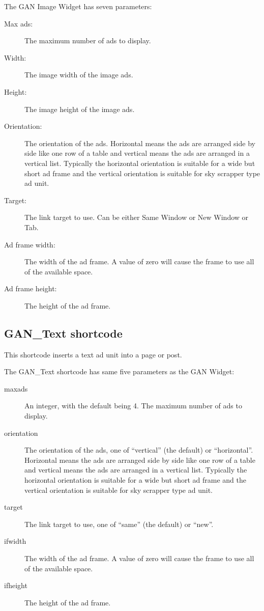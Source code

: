 \documentclass[letterpaper]{article}
\begin{document}
The GAN Image Widget has seven parameters:
\begin{description}
  \item[Max ads:] The maximum number of ads to display.
  \item[Width:] The image width of the image ads.
  \item[Height:] The image height of the image ads.
  \item[Orientation:] The orientation of the ads. Horizontal
means the ads are arranged side by side like one row of a table and
vertical means the ads are arranged in a vertical list. Typically the
horizontal orientation is suitable for a wide but short ad frame and the
vertical orientation is suitable for sky scrapper type ad unit.
  \item[Target:] The link target to use. Can be either Same 
Window or New Window or Tab.
  \item[Ad frame width:] The width of the ad frame. A value
of zero will cause the frame to use all of the available space.
  \item[Ad frame height:] The height of the ad frame.
\end{description}

\subsection{GAN\_Text shortcode}

This shortcode inserts a text ad unit into a page or post.

The GAN\_Text shortcode has same five parameters as the GAN
Widget:
\begin{description}
  \item[maxads] An integer, with the default being 4.
The maximum number of ads to display.
  \item[orientation] The orientation of the ads, one of
``vertical'' (the default) or ``horizontal''. Horizontal means the ads are
arranged side by side like one row of a table and      vertical means
the ads are arranged in a vertical list. Typically the horizontal
orientation is suitable for a wide but short ad frame and the vertical
orientation is suitable for sky scrapper type ad unit.
  \item[target] The link target to use, one of ``same'' (the
default) or ``new''.
  \item[ifwidth] The width of the ad frame. A value
of zero will cause the frame to use all of the available space.
  \item[ifheight] The height of the ad frame.
\end{description}
\end{document}
